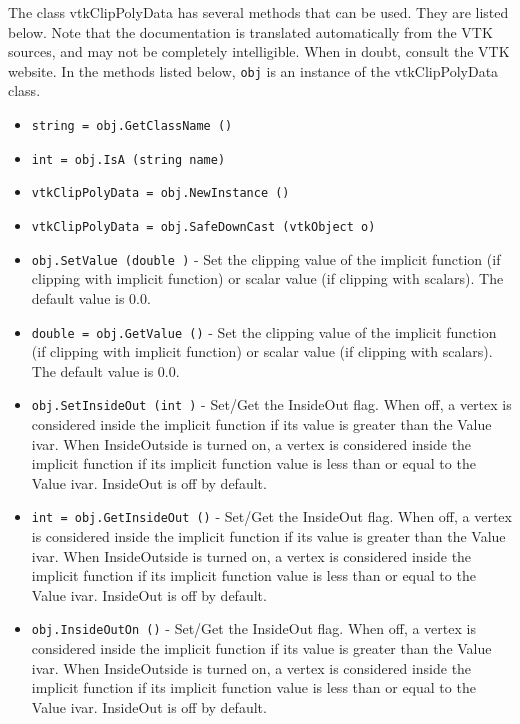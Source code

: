 The class vtkClipPolyData has several methods that can be used.
  They are listed below.
Note that the documentation is translated automatically from the VTK sources,
and may not be completely intelligible.  When in doubt, consult the VTK website.
In the methods listed below, \verb|obj| is an instance of the vtkClipPolyData class.
\begin{itemize}
\item  \verb|string = obj.GetClassName ()|

\item  \verb|int = obj.IsA (string name)|

\item  \verb|vtkClipPolyData = obj.NewInstance ()|

\item  \verb|vtkClipPolyData = obj.SafeDownCast (vtkObject o)|

\item  \verb|obj.SetValue (double )| -  Set the clipping value of the implicit function (if clipping with
 implicit function) or scalar value (if clipping with
 scalars). The default value is 0.0. 

\item  \verb|double = obj.GetValue ()| -  Set the clipping value of the implicit function (if clipping with
 implicit function) or scalar value (if clipping with
 scalars). The default value is 0.0. 

\item  \verb|obj.SetInsideOut (int )| -  Set/Get the InsideOut flag. When off, a vertex is considered
 inside the implicit function if its value is greater than the
 Value ivar. When InsideOutside is turned on, a vertex is
 considered inside the implicit function if its implicit function
 value is less than or equal to the Value ivar.  InsideOut is off
 by default.

\item  \verb|int = obj.GetInsideOut ()| -  Set/Get the InsideOut flag. When off, a vertex is considered
 inside the implicit function if its value is greater than the
 Value ivar. When InsideOutside is turned on, a vertex is
 considered inside the implicit function if its implicit function
 value is less than or equal to the Value ivar.  InsideOut is off
 by default.

\item  \verb|obj.InsideOutOn ()| -  Set/Get the InsideOut flag. When off, a vertex is considered
 inside the implicit function if its value is greater than the
 Value ivar. When InsideOutside is turned on, a vertex is
 considered inside the implicit function if its implicit function
 value is less than or equal to the Value ivar.  InsideOut is off
 by default.


\end{itemize}
